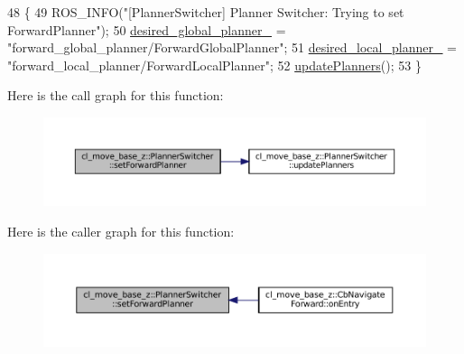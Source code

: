 \begin{DoxyCode}
48 \{
49   ROS\_INFO(\textcolor{stringliteral}{"[PlannerSwitcher] Planner Switcher: Trying to set ForwardPlanner"});
50   \hyperlink{classcl__move__base__z_1_1PlannerSwitcher_aef047d3778b2993c1df146bbad43e03d}{desired\_global\_planner\_} = \textcolor{stringliteral}{"forward\_global\_planner/ForwardGlobalPlanner"};
51   \hyperlink{classcl__move__base__z_1_1PlannerSwitcher_a6cbf65f11bb69125f913caaabdf7b4cf}{desired\_local\_planner\_} = \textcolor{stringliteral}{"forward\_local\_planner/ForwardLocalPlanner"};
52   \hyperlink{classcl__move__base__z_1_1PlannerSwitcher_a146641f63aea3185daab4c5cbb789550}{updatePlanners}();
53 \}
\end{DoxyCode}
Here is the call graph for this function\+:
\nopagebreak
\begin{figure}[H]
\begin{center}
\leavevmode
\includegraphics[width=350pt]{classcl__move__base__z_1_1PlannerSwitcher_a4bec9859c90f125f9fcc2b68594caf17_cgraph}
\end{center}
\end{figure}
Here is the caller graph for this function\+:
\nopagebreak
\begin{figure}[H]
\begin{center}
\leavevmode
\includegraphics[width=350pt]{classcl__move__base__z_1_1PlannerSwitcher_a4bec9859c90f125f9fcc2b68594caf17_icgraph}
\end{center}
\end{figure}
\mbox{\label{classcl__move__base__z_1_1PlannerSwitcher_a0accdff89d7858658c1835f06b53786f}} 
